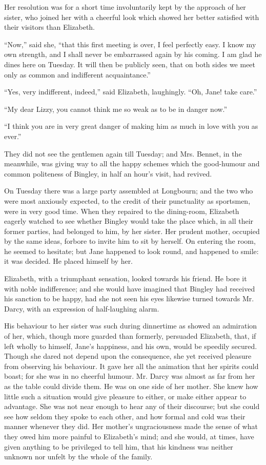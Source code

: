 \documentclass[10pt]{book}
\begin{document}
   Her resolution was for a short time involuntarily kept by the approach
of her sister, who joined her with a cheerful look which showed her
better satisfied with their visitors than Elizabeth.
  

   “Now,” said she, “that this first meeting is over, I feel perfectly
easy. I know my own strength, and I shall never be embarrassed again by
his coming. I am glad he dines here on Tuesday. It will then be publicly
seen, that on both sides we meet only as common and indifferent
acquaintance.”
  

   “Yes, very indifferent, indeed,” said Elizabeth, laughingly. “Oh, Jane!
take care.”
  

   “My dear Lizzy, you cannot think me so weak as to be in danger now.”
  

   “I think you are in very great danger of making him as much in love with
you as ever.”
  

   They did not see the gentlemen again till Tuesday; and Mrs. Bennet, in
the meanwhile, was giving way to all the happy schemes which the
good-humour and common politeness of Bingley, in half an hour’s visit,
had revived.
  

   On Tuesday there was a large party assembled at Longbourn; and the two
who were most anxiously expected, to the credit of their punctuality as
sportsmen, were in very good time. When they repaired to the
dining-room, Elizabeth eagerly watched to see whether Bingley would take
the place which, in all their former parties, had belonged to him, by
her sister. Her prudent mother, occupied by the same ideas, forbore to
invite him to sit by herself. On entering the room, he
   seemed to
hesitate; but Jane happened to look round, and happened to smile: it was
decided. He placed himself by her.
  

   Elizabeth, with a triumphant sensation, looked towards his friend. He
bore it with noble indifference; and she would have imagined that
Bingley had received his sanction to be happy, had she not seen his eyes
likewise turned towards Mr. Darcy, with an expression of half-laughing
alarm.
  

   His behaviour to her sister was such during dinnertime as showed an
admiration of her, which, though more guarded than formerly, persuaded
Elizabeth, that, if left wholly to himself, Jane’s happiness, and his
own, would be speedily secured. Though she dared not depend upon the
consequence, she yet received pleasure from observing his behaviour. It
gave her all the animation that her spirits could boast; for she was in
no cheerful humour. Mr. Darcy was almost as far from her as the table
could divide them. He was on one side of her mother. She knew how little
such a situation would give pleasure to either, or make either appear to
advantage. She was not near enough to hear any of their discourse; but
she could see how seldom they spoke to each other, and how formal and
cold was their manner whenever they did. Her mother’s ungraciousness
made the sense of what they owed him more painful to Elizabeth’s mind;
and she would, at times, have given anything to be privileged to tell
him, that his kindness was neither unknown nor unfelt by the whole of
the family.
  
\end{document}

